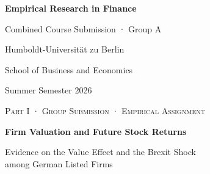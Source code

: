 \begin{titlepage}
  \thispagestyle{empty}
  \singlespacing
  \centering

  \vspace*{0.5cm}

  {\fontsize{28}{30}\bfseries\selectfont
  Empirical Research in Finance\par
  }

  \vspace*{0.5cm}

  {\fontsize{18}{14}\selectfont
  Combined Course Submission · Group A\par
  }

  \vspace*{0.75cm}

  {\fontsize{10}{12}\selectfont
  Humboldt-Universität zu Berlin\par
  \vspace*{0.15cm}
  School of Business and Economics\par
  \vspace*{0.15cm}
  Summer Semester 2026\par
  }

  \vspace*{2cm}

  {\fontsize{12}{10}\scshape\selectfont
  Part I · Group Submission · Empirical Assignment
  }
  
  \vspace*{0.35cm}

  {\fontsize{20}{16}\bfseries\selectfont
  Firm Valuation and Future Stock Returns\par
  }

  \vspace*{0.35cm}

  {\fontsize{13}{16}\selectfont
    Evidence on the Value Effect and the Brexit Shock\\
    among German Listed Firms\par
  }

  \vspace*{2cm}

  \noindent
  

\end{titlepage}
